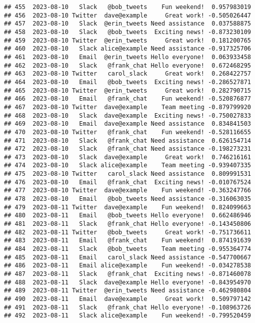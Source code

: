 \documentclass[
]{article}
\begin{document}
\begin{verbatim}
## 455  2023-08-10   Slack   @bob_tweets    Fun weekend!  0.957983019
## 456  2023-08-10 Twitter  dave@example     Great work! -0.505026447
## 457  2023-08-10   Slack  @erin_tweets Need assistance  0.037588875
## 458  2023-08-10   Slack   @bob_tweets  Exciting news! -0.873230109
## 459  2023-08-10 Twitter  @erin_tweets     Great work!  0.181200765
## 460  2023-08-10   Slack alice@example Need assistance -0.917325706
## 461  2023-08-10   Email  @erin_tweets Hello everyone!  0.063933458
## 462  2023-08-10   Slack   @frank_chat Hello everyone!  0.672468295
## 463  2023-08-10 Twitter   carol_slack     Great work!  0.268422757
## 464  2023-08-10   Email   @bob_tweets  Exciting news! -0.286527871
## 465  2023-08-10 Twitter  @erin_tweets     Great work!  0.282790715
## 466  2023-08-10   Email   @frank_chat    Fun weekend! -0.520876877
## 467  2023-08-10 Twitter  dave@example    Team meeting -0.879799920
## 468  2023-08-10   Slack  dave@example  Exciting news! -0.750027833
## 469  2023-08-10   Email  dave@example Need assistance  0.834841503
## 470  2023-08-10 Twitter   @frank_chat    Fun weekend! -0.528116655
## 471  2023-08-10   Slack   @frank_chat Need assistance  0.626154714
## 472  2023-08-10   Slack   @frank_chat Need assistance -0.198273231
## 473  2023-08-10   Slack  dave@example     Great work!  0.746216161
## 474  2023-08-10   Slack alice@example    Team meeting -0.939407335
## 475  2023-08-10 Twitter   carol_slack Need assistance  0.809991531
## 476  2023-08-10   Email   @frank_chat  Exciting news! -0.010767524
## 477  2023-08-10 Twitter  dave@example    Fun weekend! -0.363247766
## 478  2023-08-10   Email   @bob_tweets Need assistance -0.316063035
## 479  2023-08-11 Twitter  dave@example    Fun weekend!  0.824099663
## 480  2023-08-11   Email   @bob_tweets Hello everyone!  0.662486946
## 481  2023-08-11   Slack   @frank_chat Hello everyone! -0.143450806
## 482  2023-08-11 Twitter   @bob_tweets     Great work! -0.751736611
## 483  2023-08-11   Email   @frank_chat    Fun weekend!  0.874191639
## 484  2023-08-11   Slack   @bob_tweets    Team meeting -0.955364774
## 485  2023-08-11   Email   carol_slack Need assistance -0.547700667
## 486  2023-08-11   Email alice@example    Fun weekend! -0.034278538
## 487  2023-08-11   Slack   @frank_chat  Exciting news! -0.871460078
## 488  2023-08-11   Slack  dave@example Hello everyone! -0.843954970
## 489  2023-08-11 Twitter  @erin_tweets Need assistance -0.462980804
## 490  2023-08-11   Email  dave@example     Great work!  0.509797142
## 491  2023-08-11   Slack   @frank_chat Hello everyone! -0.108963726
## 492  2023-08-11   Slack alice@example    Fun weekend! -0.799520459

\end{verbatim}
\end{document}
